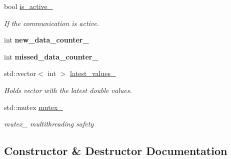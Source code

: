 \begin{DoxyCompactItemize}
\mbox{\label{classblmc__drivers_1_1SerialReader_abf6fd962e185be25e6c61c63f8eb0cc9}} 
bool \hyperlink{classblmc__drivers_1_1SerialReader_abf6fd962e185be25e6c61c63f8eb0cc9}{is\+\_\+active\+\_\+}
\begin{DoxyCompactList}\small\item\em If the communication is active. \end{DoxyCompactList}\item 
\mbox{\label{classblmc__drivers_1_1SerialReader_a862829c3e7f3c59b1e3be49b61e6cfb5}} 
int {\bfseries new\+\_\+data\+\_\+counter\+\_\+}
\item 
\mbox{\label{classblmc__drivers_1_1SerialReader_a516bbec3112f46bb6442858d2d9446bf}} 
int {\bfseries missed\+\_\+data\+\_\+counter\+\_\+}
\item 
\mbox{\label{classblmc__drivers_1_1SerialReader_ac6f46fc37c9ce41908ad76b012d2160b}} 
std\+::vector$<$ int $>$ \hyperlink{classblmc__drivers_1_1SerialReader_ac6f46fc37c9ce41908ad76b012d2160b}{latest\+\_\+values\+\_\+}
\begin{DoxyCompactList}\small\item\em Holds vector with the latest double values. \end{DoxyCompactList}\item 
\mbox{\label{classblmc__drivers_1_1SerialReader_a38d2ba095d199db4ae9858b888ef20de}} 
std\+::mutex \hyperlink{classblmc__drivers_1_1SerialReader_a38d2ba095d199db4ae9858b888ef20de}{mutex\+\_\+}
\begin{DoxyCompactList}\small\item\em mutex\+\_\+ multithreading safety \end{DoxyCompactList}\end{DoxyCompactItemize}


\subsection{Constructor \& Destructor Documentation}
\mbox{\label{classblmc__drivers_1_1SerialReader_a894216b6799b0ea9945f8a1cf98f9801}} 
